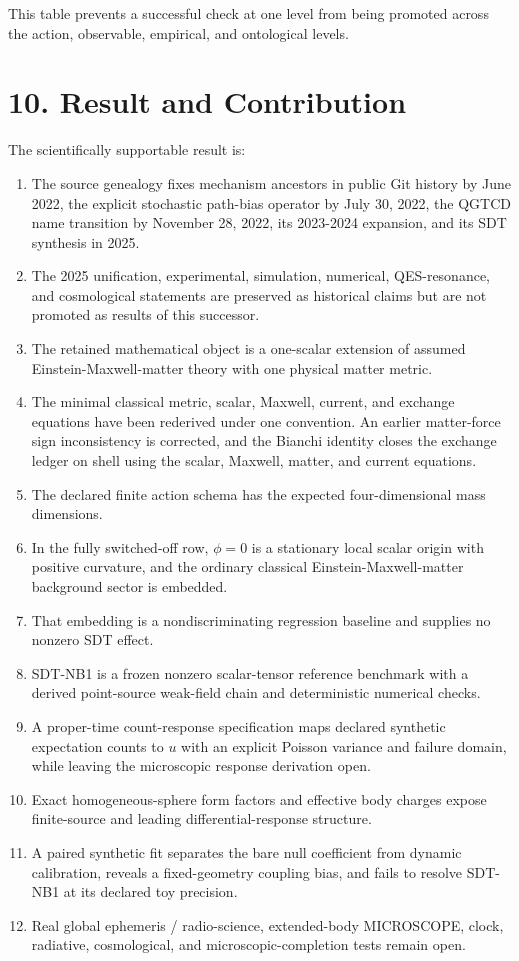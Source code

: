 \documentclass[
  american,
  11pt,
  letterpaper,
]{article}
\providecommand{\tightlist}{%
  \setlength{\itemsep}{0pt}\setlength{\parskip}{0pt}}
\begin{document}
This table prevents a successful check at one level from being promoted across the action, observable, empirical, and ontological levels.

\section{10. Result and Contribution}\label{result-and-contribution}

The scientifically supportable result is:

\begin{enumerate}
\def\labelenumi{\arabic{enumi}.}
\tightlist
\item
  The source genealogy fixes mechanism ancestors in public Git history by June 2022, the explicit stochastic path-bias operator by July 30, 2022, the QGTCD name transition by November 28, 2022, its 2023-2024 expansion, and its SDT synthesis in 2025.
\item
  The 2025 unification, experimental, simulation, numerical, QES-resonance, and cosmological statements are preserved as historical claims but are not promoted as results of this successor.
\item
  The retained mathematical object is a one-scalar extension of assumed Einstein-Maxwell-matter theory with one physical matter metric.
\item
  The minimal classical metric, scalar, Maxwell, current, and exchange equations have been rederived under one convention. An earlier matter-force sign inconsistency is corrected, and the Bianchi identity closes the exchange ledger on shell using the scalar, Maxwell, matter, and current equations.
\item
  The declared finite action schema has the expected four-dimensional mass dimensions.
\item
  In the fully switched-off row, \(\phi=0\) is a stationary local scalar origin with positive curvature, and the ordinary classical Einstein-Maxwell-matter background sector is embedded.
\item
  That embedding is a nondiscriminating regression baseline and supplies no nonzero SDT effect.
\item
  SDT-NB1 is a frozen nonzero scalar-tensor reference benchmark with a derived point-source weak-field chain and deterministic numerical checks.
\item
  A proper-time count-response specification maps declared synthetic expectation counts to \(u\) with an explicit Poisson variance and failure domain, while leaving the microscopic response derivation open.
\item
  Exact homogeneous-sphere form factors and effective body charges expose finite-source and leading differential-response structure.
\item
  A paired synthetic fit separates the bare null coefficient from dynamic calibration, reveals a fixed-geometry coupling bias, and fails to resolve SDT-NB1 at its declared toy precision.
\item
  Real global ephemeris / radio-science, extended-body MICROSCOPE, clock, radiative, cosmological, and microscopic-completion tests remain open.
\end{enumerate}
\end{document}
